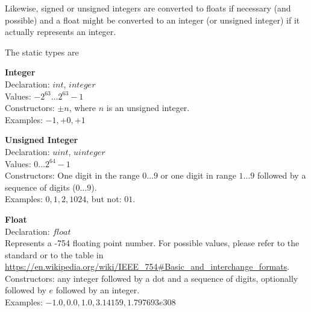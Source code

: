Likewise, signed or unsigned integers are converted to floats
if necessary (and possible) and a float might be converted
to an integer (or unsigned integer) if it actually
represents an integer.

The static types are


\begin{minipage}{\textwidth}
\textbf{Integer}\\
Declaration: $int$, $integer$ \\
Values: $-2^{63} \dots 2^{63}-1$ \\
Constructors: $\pm n$, where $n$ is an unsigned integer.\\
Examples: $-1, +0, +1$
\end{minipage}

\begin{minipage}{\textwidth}
\textbf{Unsigned Integer} \\
Declaration: $uint$, $uinteger$ \\
Values: $0 \dots 2^{64}-1$  \\
Constructors: One digit in the range $0\dots 9$
or one digit in range $1\dots 9$ followed by
a sequence of digits ($0\dots9$). \\
Examples: $0, 1, 2, 1024$, but not: $01$.
\end{minipage}

\begin{minipage}{\textwidth}
\textbf{Float} \\
Declaration: $float$ \\
Represents a  -754 floating point number.
For possible values, please refer to the standard or to the table in
\url{https://en.wikipedia.org/wiki/IEEE\_754#Basic\_and\_interchange\_formats}.\\
Constructors: any integer followed by a dot and a sequence of digits,
              optionally followed by $e$ followed by an integer.
               \\
Examples: $-1.0, 0.0, 1.0, 3.14159, 1.797693e308$ 
\end{minipage}

